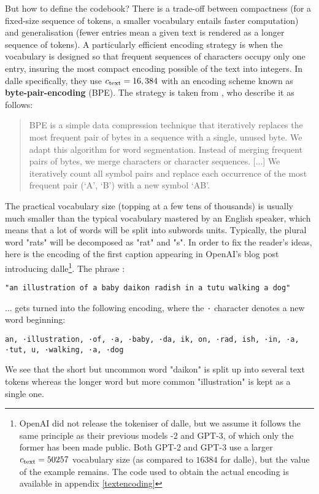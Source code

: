 \documentclass{article}
\begin{document}
\begin{multicols}{2}
But how to define the codebook?
There is a trade-off between compactness (for a fixed-size sequence of tokens, a smaller vocabulary entails faster computation) and generalisation (fewer entries mean a given text is rendered as a longer sequence of tokens).
A particularly efficient encoding strategy is when the vocabulary is designed so that frequent sequences of characters occupy only one entry, insuring the most compact encoding possible of the text into integers.
In \gls{dalle} specifically, they use ${c_{\mathrm{text}}}=16,384$ with an encoding scheme known as \textbf{byte-pair-encoding} (BPE). The strategy is taken from \citet{subword-units}, who describe it as follows:

\blockquote{
BPE is a simple data compression technique that iteratively replaces the most frequent pair of bytes in a sequence with a single, unused byte.
We adapt this algorithm for word segmentation.
Instead of merging frequent pairs of bytes, we merge characters or character sequences.
[...]
We iteratively count all symbol pairs and replace each occurrence of the most frequent pair (‘A’, ‘B’) with a new symbol ‘AB’.
}

The practical vocabulary size (topping at a few tens of thousands) is usually much smaller than the typical vocabulary mastered by an English speaker, which means that a lot of words will be split into subwords units.
Typically, the plural word "rats" will be decomposed as "rat" and "s".
In order to fix the reader's ideas, here is the encoding of the first caption appearing in OpenAI's blog post introducing \gls{dalle}\footnote{OpenAI did not release the tokeniser of \gls{dalle}, but we assume it follows the same principle as their previous models -2 and GPT-3, of which only the former has been made public. Both GPT-2 and GPT-3 use a larger ${c_{\mathrm{text}}}=50257$ vocabulary size (as compared to $16384$ for \gls{dalle}), but the value of the example remains. The code used to obtain the actual encoding is available in appendix \ref{textencoding}}. The phrase :

\texttt{"an illustration of a baby daikon radish in a tutu walking a dog"}

... gets turned into the following encoding, where the \verb+·+ character denotes a new word beginning:

\texttt{an, ·illustration, ·of, ·a, ·baby, ·da, ik, on, ·rad, ish, ·in, ·a, ·tut, u, ·walking, ·a, ·dog}

We see that the short but uncommon word "daikon" is split up into several text tokens whereas the longer word but more common "illustration" is kept as a single one.


\end{multicols}
\end{document}
